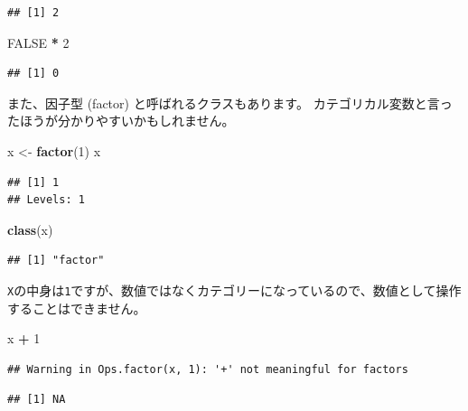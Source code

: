 \documentclass[]{bxjsreport}
\newenvironment{Shaded}{\begin{snugshade}}{\end{snugshade}}
\newcommand{\DecValTok}[1]{\textcolor[rgb]{0.00,0.00,0.81}{#1}}
\newcommand{\KeywordTok}[1]{\textcolor[rgb]{0.13,0.29,0.53}{\textbf{#1}}}
\newcommand{\NormalTok}[1]{#1}
\newcommand{\OperatorTok}[1]{\textcolor[rgb]{0.81,0.36,0.00}{\textbf{#1}}}
\newcommand{\OtherTok}[1]{\textcolor[rgb]{0.56,0.35,0.01}{#1}}
\newcommand{\StringTok}[1]{\textcolor[rgb]{0.31,0.60,0.02}{#1}}
\begin{document}
\begin{verbatim}
## [1] 2
\end{verbatim}

\begin{Shaded}
\begin{Highlighting}[]
\OtherTok{FALSE} \OperatorTok{*}\StringTok{ }\DecValTok{2}
\end{Highlighting}
\end{Shaded}

\begin{verbatim}
## [1] 0
\end{verbatim}

また、因子型 (factor) と呼ばれるクラスもあります。
カテゴリカル変数と言ったほうが分かりやすいかもしれません。

\begin{Shaded}
\begin{Highlighting}[]
\NormalTok{x <-}\StringTok{ }\KeywordTok{factor}\NormalTok{(}\DecValTok{1}\NormalTok{)}
\NormalTok{x}
\end{Highlighting}
\end{Shaded}

\begin{verbatim}
## [1] 1
## Levels: 1
\end{verbatim}

\begin{Shaded}
\begin{Highlighting}[]
\KeywordTok{class}\NormalTok{(x)}
\end{Highlighting}
\end{Shaded}

\begin{verbatim}
## [1] "factor"
\end{verbatim}

\texttt{X}の中身は\texttt{1}ですが、数値ではなくカテゴリーになっているので、数値として操作することはできません。

\begin{Shaded}
\begin{Highlighting}[]
\NormalTok{x }\OperatorTok{+}\StringTok{ }\DecValTok{1}
\end{Highlighting}
\end{Shaded}

\begin{verbatim}
## Warning in Ops.factor(x, 1): '+' not meaningful for factors
\end{verbatim}

\begin{verbatim}
## [1] NA
\end{verbatim}
\end{document}
